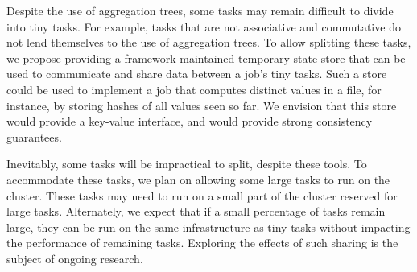 Despite the use of aggregation trees, some tasks may remain difficult to
divide into tiny tasks. For example, tasks that are not associative and
commutative do not lend themselves to the use of aggregation trees.
To allow splitting these tasks, we propose providing a framework-maintained
temporary state store that can be used to communicate and share data between a
job's tiny tasks. Such a store could be used to implement a job that computes
distinct values in a file, for instance, by storing hashes of all values
seen so far. We envision that this store would provide a key-value interface,
and would provide strong consistency guarantees.

Inevitably, some tasks will be impractical to split, despite these tools.
To accommodate these
tasks, we plan on allowing some large tasks to run on the cluster. These tasks
may need to run on a small part of the cluster reserved for large tasks.
Alternately, we expect that if a small percentage of tasks remain large, they
can be run on the same infrastructure as tiny tasks without impacting the
performance of remaining tasks. Exploring the effects of such sharing is
the subject of ongoing research.

